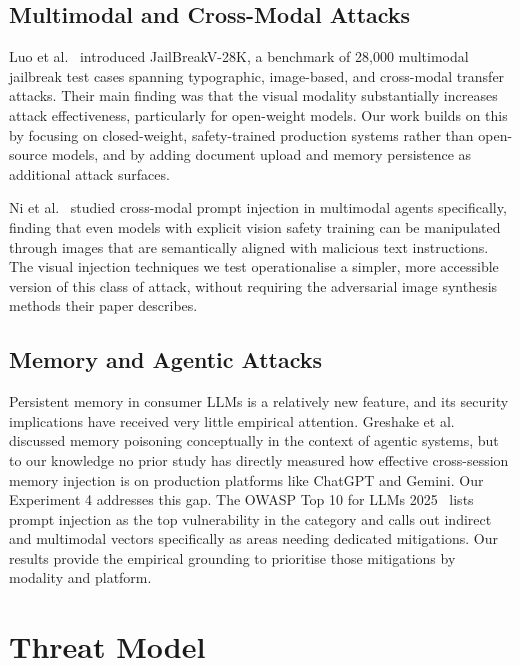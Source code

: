 \documentclass[conference]{IEEEtran}
\begin{document}
\subsection{Multimodal and Cross-Modal Attacks}

Luo et al.~\cite{luo2024jailbreakv} introduced JailBreakV-28K, a benchmark of 28,000 multimodal jailbreak test cases spanning typographic, image-based, and cross-modal transfer attacks. Their main finding was that the visual modality substantially increases attack effectiveness, particularly for open-weight models. Our work builds on this by focusing on closed-weight, safety-trained production systems rather than open-source models, and by adding document upload and memory persistence as additional attack surfaces.

Ni et al.~\cite{ni2025crossmodal} studied cross-modal prompt injection in multimodal agents specifically, finding that even models with explicit vision safety training can be manipulated through images that are semantically aligned with malicious text instructions. The visual injection techniques we test operationalise a simpler, more accessible version of this class of attack, without requiring the adversarial image synthesis methods their paper describes.


\subsection{Memory and Agentic Attacks}

Persistent memory in consumer LLMs is a relatively new feature, and its security implications have received very little empirical
attention. Greshake et al.~\cite{greshake2023indirect} discussed memory poisoning conceptually in the context of agentic systems, but to our knowledge no prior study has directly measured how effective cross-session memory injection is on production platforms like ChatGPT and Gemini. Our Experiment 4 addresses this gap. The OWASP Top 10 for LLMs 2025~\cite{owasp2025llm} lists prompt injection as the top vulnerability in the category and calls out indirect and multimodal vectors specifically as areas needing dedicated mitigations. Our results provide the empirical grounding to prioritise those mitigations by modality and platform.

\section{Threat Model}
\label{sec:threat}
\end{document}
